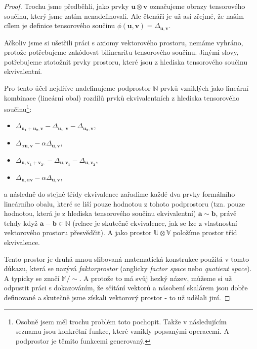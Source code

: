 \documentclass[a5paper,12pt]{amsbook}
\theoremstyle{definition}
\newcommand{\myvec}[1]{\bm{#1}}
\newcommand{\myspace}[1]{\mathbb{#1}}
\begin{document}
\begin{proof}
Trochu jsme předběhli, jako prvky $\myvec{u}\otimes\myvec{v}$ označujeme obrazy tensorového
součinu, který jsme zatím nenadefinovali. Ale čtenáři je už asi zřejmé, že naším cílem
je definice tensorového součinu $\phi(\myvec{u}, \myvec{v}) = \Delta_{\myvec{u}, \myvec{v}}$.

Ačkoliv jsme si ušetřili práci s axiomy vektorového prostoru, nemáme vyhráno, protože
potřebujeme zakódovat bilinearitu tensorového součinu. Jinými slovy, potřebujeme
ztotožnit prvky prostoru, které jsou z hlediska tensorového součinu ekvivalentní.

Pro tento účel nejdříve nadefinujeme podprostor $\myspace{N}$ prvků vzniklých jako
lineární kombinace (lineární obal) rozdílů prvků ekvivalentních z hlediska
tensorového součinu\footnote{
	Osobně jsem měl trochu problém toto pochopit. Takže v následujícím seznamu
	jsou konkrétní funkce, které vznikly popsanými operacemi. A podprostor je
	těmito funkcemi generovaný.
}:
\begin{itemize}
\item $\Delta_{\myvec{u_1} + \myvec{u_2}, \myvec{v}} - \Delta_{\myvec{u_1}, \myvec{v}}
  - \Delta_{\myvec{u_2}, \myvec{v}}$,
\item $\Delta_{\alpha\myvec{u}, \myvec{v}} - \alpha\Delta_{\myvec{u}, \myvec{v}}$,
\item $\Delta_{\myvec{u}, \myvec{v_1} + \myvec{v_2}, } - \Delta_{\myvec{u}, \myvec{v_1}}
- \Delta_{\myvec{u}, \myvec{v_2}}$,
\item $\Delta_{\myvec{u}, \alpha\myvec{v}} - \alpha\Delta_{\myvec{u}, \myvec{v}}$,
\end{itemize}
a následně do stejné třídy ekvivalence zařadíme každé dva prvky formálního lineárního
obalu, které se liší pouze hodnotou z tohoto podprostoru (tzn. pouze hodnotou, která
je z hlediska tensorového součinu ekvivalentní) $\myvec{a} \sim \myvec{b}$, právě
tehdy když $\myvec{a} - \myvec{b}\in\myspace{N}$ (relace je skutečně ekvivalence,
jak se lze z vlastnostní vektorového prostoru přesvědčit). A jako prostor
$\myspace{U}\otimes\myspace{V}$ položíme prostor tříd ekvivalence.

Tento prostor je druhá mnou slibovaná matematická konstrukce použitá v tomto důkazu,
která se nazývá \textit{faktorprostor} (anglicky \textit{factor space} nebo
\textit{quotient space}). A typicky se značí $\myspace{M}/{\sim}$. A protože to má
svůj hezký název, můžeme si už odpustit práci s dokazováním, že sčítání vektorů
a násobení skalárem jsou dobře definované a skutečně jsme získali vektorový prostor
- to už udělali jiní.


\end{proof}
\end{document}
